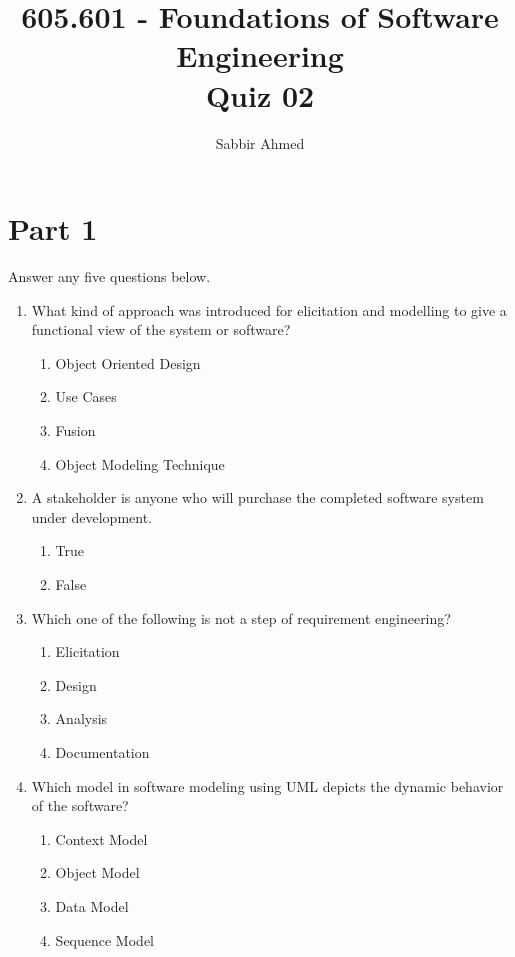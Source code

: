 \documentclass[12pt]{article}
\newcommand{\answeritem}{\global\answertrue\item}
\newcommand{\perhapsanswer}{%
  \ifanswer
    $\blacksquare$ \global\answerfalse
  \else
    $\square$ \global\answerfalse
  \fi
}
\newif\ifanswer
\begin{document}
  \title{605.601 - Foundations of Software Engineering \\ Quiz 02\vspace{-0.5em}}
  \author{Sabbir Ahmed}
  \maketitle
  \vspace{-1em}

  \section*{Part 1} Answer any five questions below.

  \begin{enumerate}

    \item What kind of approach was introduced for elicitation and modelling to give a functional view of the system or software?
    \begin{enumerate}[start=1,align=left,label={\protect\perhapsanswer(\alph*)}]
      \item Object Oriented Design
      \answeritem Use Cases
      \item Fusion
      \item Object Modeling Technique
    \end{enumerate}

    \item A stakeholder is anyone who will purchase the completed software system under development.
    \begin{enumerate}[start=1,align=left,label={\protect\perhapsanswer(\alph*)}]
      \item True
      \answeritem False
    \end{enumerate}

    \item Which one of the following is not a step of requirement engineering?
    \begin{enumerate}[start=1,align=left,label={\protect\perhapsanswer(\alph*)}]
      \answeritem Elicitation
      \item Design
      \item Analysis
      \item Documentation
    \end{enumerate}

    \item Which model in software modeling using UML depicts the dynamic behavior of the software?
    \begin{enumerate}[start=1,align=left,label={\protect\perhapsanswer(\alph*)}]
      \item Context Model
      \item Object Model
      \item Data Model
      \item Sequence Model
    \end{enumerate}


\end{enumerate}
\end{document}
